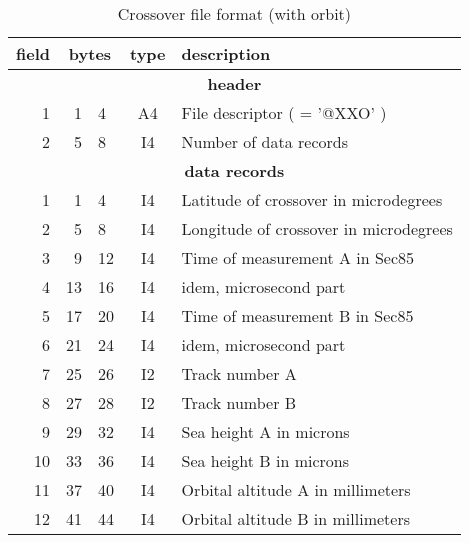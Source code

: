 \begin{table}
\caption{Crossover file format (with orbit)}
\medskip
\begin{tabular}{|rr@{--}lc|p{}|}
\hline
field&\multicolumn{2}{c}{bytes}&type&description \\
\hline
\multicolumn{5}{c}{\bf header} \\
\hline
 1 & 1 & 4 & A4 & File descriptor ( = '@XXO' ) \\
 2 & 5 & 8 & I4 & Number of data records \\
\hline
\multicolumn{5}{c}{\bf data records} \\
\hline
 1 & 1 & 4 & I4 & Latitude of crossover in microdegrees \\
 2 & 5 & 8 & I4 & Longitude of crossover in microdegrees \\
 3 & 9 &12 & I4 & Time of measurement A in Sec85 \\
 4 &13 &16 & I4 & idem, microsecond part \\
 5 &17 &20 & I4 & Time of measurement B in Sec85 \\
 6 &21 &24 & I4 & idem, microsecond part \\
 7 &25 &26 & I2 & Track number A \\
 8 &27 &28 & I2 & Track number B \\
 9 &29 &32 & I4 & Sea height A in microns \\
10 &33 &36 & I4 & Sea height B in microns \\
11 &37 &40 & I4 & Orbital altitude A in millimeters \\
12 &41 &44 & I4 & Orbital altitude B in millimeters \\
\hline
\end{tabular}
\end{table}

